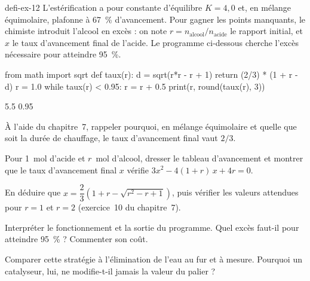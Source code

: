 \begin{blocEdition}{defi-ex-12}
L'estérification  a pour constante d'équilibre $K=4{,}0$ et, en mélange
équimolaire, plafonne à 67~\% d'avancement. Pour gagner les points manquants, le chimiste introduit l'alcool en
excès : on note $r=n_{\text{alcool}}/n_{\text{acide}}$ le rapport initial, et $x$ le taux d'avancement final de
l'acide. Le programme ci-dessous cherche l'excès nécessaire pour atteindre 95~\%.
\begin{codecote}[0.66]
\begin{pythoncol}
from math import sqrt
def taux(r):
    d = sqrt(r*r - r + 1)
    return (2/3) * (1 + r - d)
r = 1.0
while taux(r) < 0.95:
    r = r + 0.5
print(r, round(taux(r), 3))
\end{pythoncol}
\cote
\begin{consolecol}
5.5 0.95
\end{consolecol}
\end{codecote}
\begin{questions}
\item À l'aide du chapitre~7, rappeler pourquoi, en mélange équimolaire et quelle que soit la durée de chauffage, le
taux d'avancement final vaut $2/3$.
\item Pour 1~mol d'acide et $r$~mol d'alcool, dresser le tableau d'avancement et montrer que le taux d'avancement
final $x$ vérifie $3x^2-4(1+r)\,x+4r=0$.
\item En déduire que $x=\dfrac{2}{3}\left(1+r-\sqrt{r^2-r+1}\right)$, puis vérifier les valeurs attendues pour $r=1$
et $r=2$ (exercice~10 du chapitre~7).
\item Interpréter le fonctionnement et la sortie du programme. Quel excès faut-il pour atteindre 95~\% ? Commenter
son coût.
\item Comparer cette stratégie à l'élimination de l'eau au fur et à mesure. Pourquoi un catalyseur, lui, ne
modifie-t-il jamais la valeur du palier ?
\end{questions}
\end{blocEdition}

